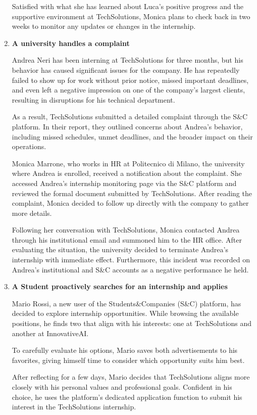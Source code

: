 \begin{enumerate}
    Satisfied with what she has learned about Luca’s positive progress and the supportive environment at TechSolutions, Monica plans to check back in two weeks to monitor any updates or changes in the internship. 

    \item \textbf{A university handles a complaint}
    
    Andrea Neri has been interning at TechSolutions for three months, but his behavior has caused significant issues for the company. He has repeatedly failed to show up for work without prior notice, missed important deadlines, and even left a negative impression on one of the company’s largest clients, resulting in disruptions for his technical department.

    As a result, TechSolutions submitted a detailed complaint through the S\&C platform. In their report, they outlined concerns about Andrea’s behavior, including missed schedules, unmet deadlines, and the broader impact on their operations.

    Monica Marrone, who works in HR at Politecnico di Milano, the university where Andrea is enrolled, received a notification about the complaint. She accessed Andrea’s internship monitoring page via the S\&C platform and reviewed the formal document submitted by TechSolutions. After reading the complaint, Monica decided to follow up directly with the company to gather more details.

    Following her conversation with TechSolutions, Monica contacted Andrea through his institutional email and summoned him to the HR office. After evaluating the situation, the university decided to terminate Andrea’s internship with immediate effect. Furthermore, this incident was recorded on Andrea’s institutional and S\&C accounts as a negative performance he held. 

     \item \textbf{A Student proactively searches for an internship and applies}
     
     Mario Rossi, a new user of the Students\&Companies (S\&C) platform, has decided to explore internship opportunities. While browsing the available positions, he finds two that align with his interests: one at TechSolutions and another at InnovativeAI.

    To carefully evaluate his options, Mario saves both advertisements to his favorites, giving himself time to consider which opportunity suits him best.

    After reflecting for a few days, Mario decides that TechSolutions aligns more closely with his personal values and professional goals. Confident in his choice, he uses the platform’s dedicated application function to submit his interest in the TechSolutions internship.


\end{enumerate}
